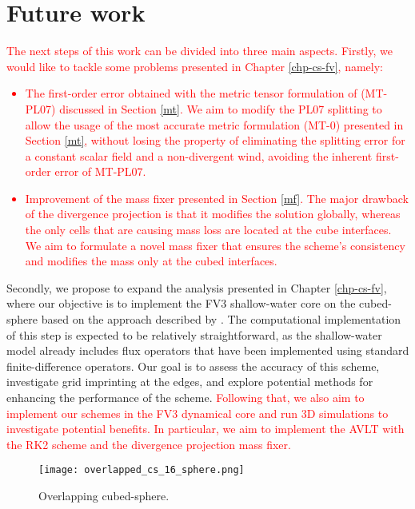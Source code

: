 \section{Future work}
\textcolor{red}{
The next steps of this work can be divided into three main aspects.
Firstly, we would like to tackle some problems presented in Chapter \ref{chp-cs-fv}, namely:
\begin{itemize}
	\item The first-order error obtained with the metric tensor formulation of \citet{putman:2007} (MT-PL07) discussed in Section \ref{mt}.
	We aim to modify the PL07 splitting to allow the usage of the most accurate metric formulation (MT-0) presented in Section \ref{mt},
	without losing the property of eliminating the splitting error for a constant scalar field and a non-divergent wind, avoiding
	the inherent first-order error of MT-PL07.
	\item Improvement of the mass fixer presented in Section \ref{mf}. The major drawback of the divergence projection is that it modifies the solution globally,
	whereas the only cells that are causing mass loss are located at the cube interfaces.
	We aim to formulate a novel mass fixer that ensures the scheme's consistency and modifies the mass only at the cubed interfaces.
\end{itemize}
}

Secondly, we propose to expand the analysis presented in Chapter \ref{chp-cs-fv},
where our objective is to implement the FV3 shallow-water core on the cubed-sphere based on the approach described by \citet{lin:1997}.
The computational implementation of this step is expected to be relatively straightforward,
as the shallow-water model already includes flux operators that have been implemented using
standard finite-difference operators. Our goal is to assess the accuracy of this scheme,
investigate grid imprinting at the edges, and explore potential methods for enhancing the performance of the scheme.
\textcolor{red}{Following that, we also aim to implement our schemes in the FV3 dynamical core and run 3D simulations to investigate potential benefits.
In particular, we aim to implement the AVLT with the RK2 scheme and the divergence projection mass fixer.}
\begin{figure}[!htb]
	\centering
	\texttt{[image: overlapped\_cs\_16\_sphere.png]}
	\caption{Overlapping cubed-sphere.\label{gridoverlaped}}
\end{figure}

